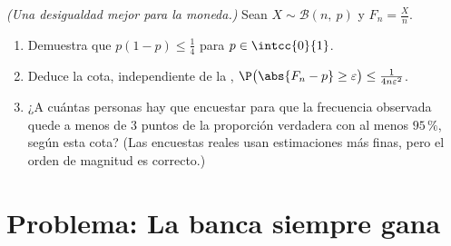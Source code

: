 \begin{exercise}[$\star\star\star$]\label{exo:g12:sums:8}
\emph{(Una desigualdad mejor para la moneda.)} Sean
$X \sim \mathcal B(n,\ p)$ y $F_n = \frac Xn$.
\begin{enumerate}
  \item Demuestra que $p(1-p) \leq \frac14$ para $p \in \intcc{0}{1}$.
  \item Deduce la cota, independiente de la ,
        $\P\bigl(\abs{F_n - p} \geq \varepsilon\bigr) \leq
        \frac{1}{4n\varepsilon^2}$.
  \item ¿A cuántas personas hay que encuestar para que la frecuencia
        observada quede a menos de $3$ puntos de la proporción verdadera
        con  al menos $95\,\%$, según esta cota? (Las encuestas
        reales usan estimaciones más finas, pero el orden de magnitud es
        correcto.)
\end{enumerate}
\end{exercise}

\section{Problema: La banca siempre gana}

